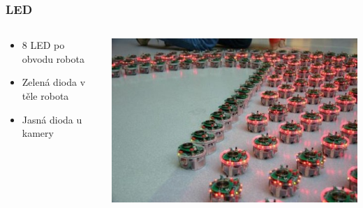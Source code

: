 \documentclass{beamer}
\begin{document}
\begin{frame}
    \frametitle{LED}
    \begin{columns}
        \begin{column}{0.5\textwidth}
            \begin{itemize}
                \item 8 LED po obvodu robota
                \item Zelená dioda v těle robota
                \item Jasná dioda u kamery
            \end{itemize}
        \end{column}

        \begin{column}{0.5\textwidth}
            \includegraphics[scale=0.3]{e-puck_3.JPG}
        \end{column}
    \end{columns}
\end{frame}
\end{document}
